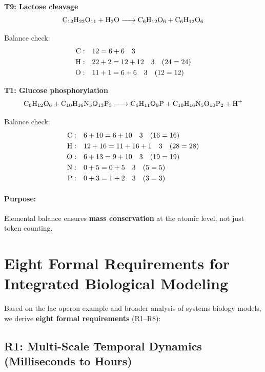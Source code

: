 \textbf{T9: Lactose cleavage}
\begin{equation}
\ce{C12H22O11 + H2O -> C6H12O6 + C6H12O6}
\end{equation}

Balance check:
\begin{align}
\text{\ce{C}}: & \quad 12 = 6 + 6 \quad \checkmark \\
\text{\ce{H}}: & \quad 22 + 2 = 12 + 12 \quad \checkmark \quad (24 = 24) \\
\text{\ce{O}}: & \quad 11 + 1 = 6 + 6 \quad \checkmark \quad (12 = 12)
\end{align}

\textbf{T1: Glucose phosphorylation}
\begin{equation}
\ce{C6H12O6 + C10H16N5O13P3 -> C6H11O9P + C10H16N5O10P2 + H+}
\end{equation}

Balance check:
\begin{align}
\text{\ce{C}}: & \quad 6 + 10 = 6 + 10 \quad \checkmark \quad (16 = 16) \\
\text{\ce{H}}: & \quad 12 + 16 = 11 + 16 + 1 \quad \checkmark \quad (28 = 28) \\
\text{\ce{O}}: & \quad 6 + 13 = 9 + 10 \quad \checkmark \quad (19 = 19) \\
\text{\ce{N}}: & \quad 0 + 5 = 0 + 5 \quad \checkmark \quad (5 = 5) \\
\text{\ce{P}}: & \quad 0 + 3 = 1 + 2 \quad \checkmark \quad (3 = 3)
\end{align}

\paragraph{Purpose:} Elemental balance ensures \textbf{mass conservation} at the atomic level, not just token counting.

\section{Eight Formal Requirements for Integrated Biological Modeling}
\label{sec:eight-requirements}

Based on the lac operon example and broader analysis of systems biology models, we derive \textbf{eight formal requirements} (R1--R8):

\subsection{R1: Multi-Scale Temporal Dynamics (Milliseconds to Hours)}
\label{subsec:r1-multiscale}

